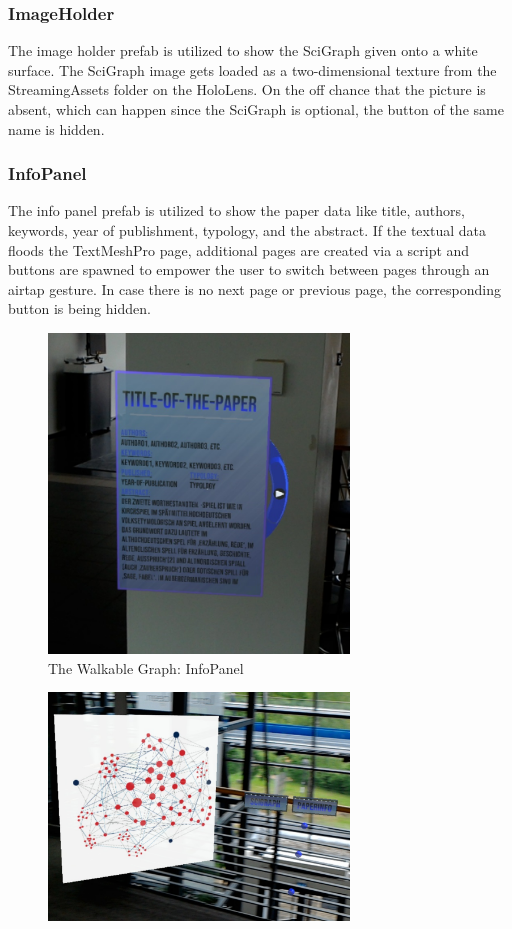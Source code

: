 \documentclass[12pt,a4paper,oneside,american,parskip=half]{article}
\begin{document}
\begin{justify}
\begin{normalsize}
\subsubsection{ImageHolder}
The image holder prefab is utilized to show the SciGraph given onto a white surface. The SciGraph image gets loaded as a two-dimensional texture from the StreamingAssets folder on the HoloLens. On the off chance that the picture is absent, which can happen since the SciGraph is optional, the button of the same name is hidden. 

\subsubsection{InfoPanel}
The info panel prefab is utilized to show the paper data like title, authors, keywords, year of publishment, typology, and the abstract. 
If the textual data floods the TextMeshPro page, additional pages are created via a script and buttons are spawned to empower the user to switch between pages through an airtap gesture. In case there is no next page or previous page, the corresponding button is being hidden.
\clearpage
\begin{figure}[h!]
\centering
\includegraphics[width=8cm]{paperInfo.jpg}
\caption{The Walkable Graph: InfoPanel}
\end{figure}
\begin{figure}[h!]
\centering
\includegraphics[width=8cm]{sciGraph.jpg}

\end{figure}
\end{normalsize}
\end{justify}
\end{document}
